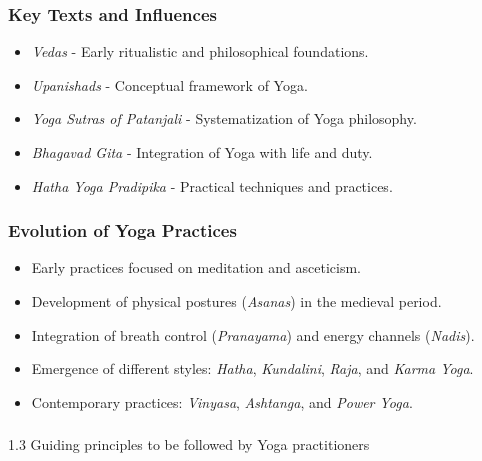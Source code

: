 \begin{frame}[fragile]\frametitle{Key Texts and Influences}

      \begin{itemize}
		\item \textit{Vedas} - Early ritualistic and philosophical foundations.
		\item \textit{Upanishads} - Conceptual framework of Yoga.
		\item \textit{Yoga Sutras of Patanjali} - Systematization of Yoga philosophy.
		\item \textit{Bhagavad Gita} - Integration of Yoga with life and duty.
		\item \textit{Hatha Yoga Pradipika} - Practical techniques and practices.
	  \end{itemize}

\end{frame}

\begin{frame}[fragile]\frametitle{Evolution of Yoga Practices}

      \begin{itemize}
		\item Early practices focused on meditation and asceticism.
		\item Development of physical postures (\textit{Asanas}) in the medieval period.
		\item Integration of breath control (\textit{Pranayama}) and energy channels (\textit{Nadis}).
		\item Emergence of different styles: \textit{Hatha}, \textit{Kundalini}, \textit{Raja}, and \textit{Karma Yoga}.
		\item Contemporary practices: \textit{Vinyasa}, \textit{Ashtanga}, and \textit{Power Yoga}.
	  \end{itemize}

\end{frame}



\begin{frame}[fragile]\frametitle{}
\begin{center}
{\Large 1.3 Guiding principles to be followed by Yoga practitioners}
\end{center}
\end{frame}

